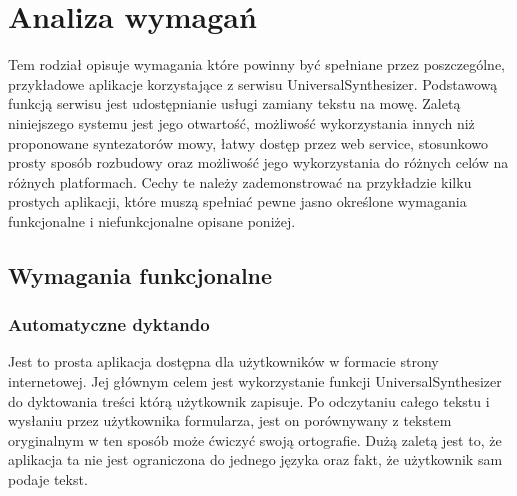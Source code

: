 
\chapter{Analiza wymagań} %



\ifpdf
    \graphicspath{{3/figures/PNG/}{3/figures/PDF/}{3/figures/}}
\else
    \graphicspath{{3/figures/EPS/}{3/figures/}}
\fi


Tem rodział opisuje wymagania które powinny być spełniane przez poszczególne, przykładowe aplikacje korzystające z serwisu UniversalSynthesizer. Podstawową funkcją serwisu jest udostępnianie usługi zamiany tekstu na mowę. Zaletą niniejszego systemu jest jego otwartość, możliwość wykorzystania innych niż proponowane syntezatorów mowy, łatwy dostęp przez web service, stosunkowo prosty sposób rozbudowy oraz możliwość jego wykorzystania do różnych celów na różnych platformach. Cechy te należy zademonstrować na przykładzie kilku prostych aplikacji, które muszą spełniać pewne jasno określone wymagania funkcjonalne i niefunkcjonalne opisane poniżej. 
\section{Wymagania funkcjonalne}

\subsection{Automatyczne dyktando}
Jest to prosta aplikacja dostępna dla użytkowników w formacie strony internetowej. Jej głównym celem jest wykorzystanie funkcji UniversalSynthesizer do dyktowania treści którą użytkownik zapisuje. Po odczytaniu całego tekstu i wysłaniu przez użytkownika formularza, jest on porównywany z tekstem oryginalnym w ten sposób może ćwiczyć swoją ortografie. Dużą zaletą jest to, że aplikacja ta nie jest ograniczona do jednego języka oraz fakt, że użytkownik sam podaje tekst.
\newpage
